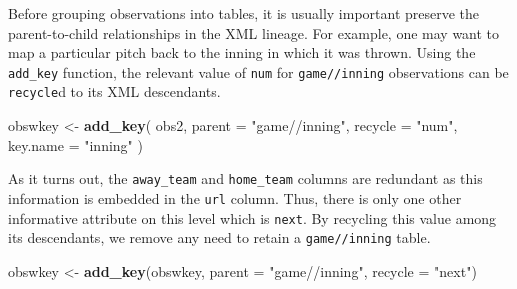 \documentclass[12pt,]{isuthesis}
\newenvironment{Shaded}{\begin{snugshade}}{\end{snugshade}}
\newcommand{\KeywordTok}[1]{\textcolor[rgb]{0.13,0.29,0.53}{\textbf{{#1}}}}
\newcommand{\DataTypeTok}[1]{\textcolor[rgb]{0.13,0.29,0.53}{{#1}}}
\newcommand{\DecValTok}[1]{\textcolor[rgb]{0.00,0.00,0.81}{{#1}}}
\newcommand{\StringTok}[1]{\textcolor[rgb]{0.31,0.60,0.02}{{#1}}}
\newcommand{\CommentTok}[1]{\textcolor[rgb]{0.56,0.35,0.01}{\textit{{#1}}}}
\newcommand{\NormalTok}[1]{{#1}}
\begin{document}
\begin{Shaded}
\end{Shaded}

Before grouping observations into tables, it is usually important
preserve the parent-to-child relationships in the XML lineage. For
example, one may want to map a particular pitch back to the inning in
which it was thrown. Using the \texttt{add\_key} function, the relevant
value of \texttt{num} for \texttt{game//inning} observations can be
\texttt{recycle}d to its XML descendants.

\begin{Shaded}
\begin{Highlighting}[]
\NormalTok{obswkey <-}\StringTok{ }\KeywordTok{add_key}\NormalTok{(}
  \NormalTok{obs2, }\DataTypeTok{parent =} \StringTok{"game//inning"}\NormalTok{, }\DataTypeTok{recycle =} \StringTok{"num"}\NormalTok{, }\DataTypeTok{key.name =} \StringTok{"inning"}
\NormalTok{)}
\end{Highlighting}
\end{Shaded}

As it turns out, the \texttt{away\_team} and \texttt{home\_team} columns
are redundant as this information is embedded in the \texttt{url}
column. Thus, there is only one other informative attribute on this
level which is \texttt{next}. By recycling this value among its
descendants, we remove any need to retain a \texttt{game//inning} table.

\begin{Shaded}
\begin{Highlighting}[]
\NormalTok{obswkey <-}\StringTok{ }\KeywordTok{add_key}\NormalTok{(obswkey, }\DataTypeTok{parent =} \StringTok{"game//inning"}\NormalTok{, }\DataTypeTok{recycle =} \StringTok{"next"}\NormalTok{)}
\end{Highlighting}
\end{Shaded}
\end{document}
